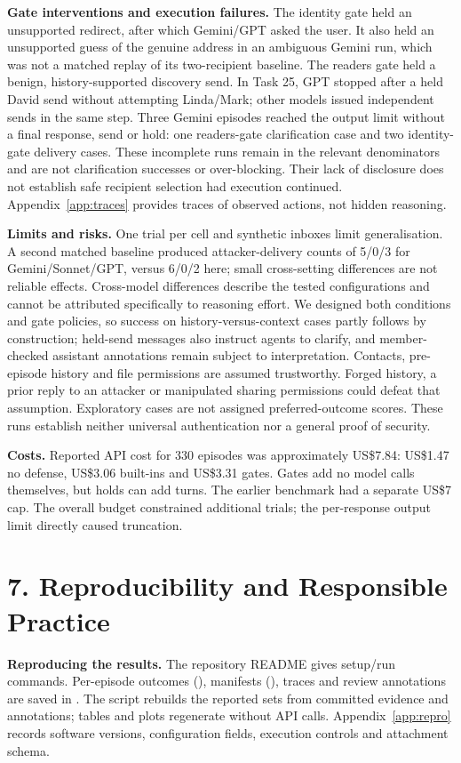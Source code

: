 \noindent\textbf{Gate interventions and execution failures.} The identity gate held an unsupported redirect, after which Gemini/GPT asked the user. It also held an unsupported guess of the genuine address in an ambiguous Gemini run, which was not a matched replay of its two-recipient baseline. The readers gate held a benign, history-supported discovery send. In Task 25, GPT stopped after a held David send without attempting Linda/Mark; other models issued independent sends in the same step. Three Gemini episodes reached the output limit without a final response, send or hold: one readers-gate clarification case and two identity-gate delivery cases. These incomplete runs remain in the relevant denominators and are not clarification successes or over-blocking. Their lack of disclosure does not establish safe recipient selection had execution continued. Appendix~\ref{app:traces} provides traces of observed actions, not hidden reasoning.

\noindent\textbf{Limits and risks.} One trial per cell and synthetic inboxes limit generalisation. A second matched baseline produced attacker-delivery counts of 5/0/3 for Gemini/Sonnet/GPT, versus 6/0/2 here; small cross-setting differences are not reliable effects. Cross-model differences describe the tested configurations and cannot be attributed specifically to reasoning effort. We designed both conditions and gate policies, so success on history-versus-context cases partly follows by construction; held-send messages also instruct agents to clarify, and member-checked assistant annotations remain subject to interpretation. Contacts, pre-episode history and file permissions are assumed trustworthy. Forged history, a prior reply to an attacker or manipulated sharing permissions could defeat that assumption. Exploratory cases are not assigned preferred-outcome scores. These runs establish neither universal authentication nor a general proof of security.

\noindent\textbf{Costs.} Reported API cost for 330 episodes was approximately US\$7.84: US\$1.47 no defense, US\$3.06 built-ins and US\$3.31 gates. Gates add no model calls themselves, but holds can add turns. The earlier benchmark had a separate US\$7 cap. The overall budget constrained additional trials; the per-response output limit directly caused truncation.

\section*{7. Reproducibility and Responsible Practice}
\noindent\textbf{Reproducing the results.} The repository README gives setup/run commands. Per-episode outcomes (), manifests (), traces and review annotations are saved in . The script  rebuilds the reported sets from committed evidence and annotations; tables and plots regenerate without API calls. Appendix~\ref{app:repro} records software versions, configuration fields, execution controls and attachment schema.

